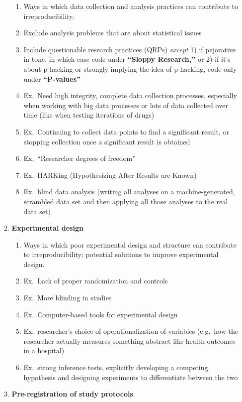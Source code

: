 \documentclass[
]{scrartcl}
\begin{document}
\begin{enumerate}
\begin{enumerate}
    \begin{enumerate}
    
    \item
      Ways in which data collection and analysis practices can
      contribute to irreproducibility.
    \item
      Exclude analysis problems that are about statistical issues
    \item
      Include questionable research practices (QRPs) \emph{except} 1) if
      pejorative in tone, in which case code under \textbf{``Sloppy
      Research,''} or 2) if it's about p-hacking or strongly implying
      the idea of p-hacking, code only under \textbf{``P-values''}
    \item
      Ex.~Need high integrity, complete data collection processes,
      especially when working with big data processes or lots of data
      collected over time (like when testing iterations of drugs)
    \item
      Ex.~Continuing to collect data points to find a significant
      result, or stopping collection once a significant result is
      obtained
    \item
      Ex.~``Researcher degrees of freedom''
    \item
      Ex.~HARKing (Hypothesizing After Results are Known)
    \item
      Ex.~blind data analysis (writing all analyses on a
      machine-generated, scrambled data set and then applying all those
      analyses to the real data set)
    \end{enumerate}
  \item
    \textbf{Experimental design}

    \begin{enumerate}
    
    \item
      Ways in which poor experimental design and structure can
      contribute to irreproducibility; potential solutions to improve
      experimental design.
    \item
      Ex.~Lack of proper randomization and controls
    \item
      Ex.~More blinding in studies
    \item
      Ex.~Computer-based tools for experimental design
    \item
      Ex.~researcher's choice of operationalization of variables
      (e.g.~how the researcher actually measures something abstract like
      health outcomes in a hospital)
    \item
      Ex.~strong inference tests, explicitly developing a competing
      hypothesis and designing experiments to differentiate between the
      two
    \end{enumerate}
  \item
    \textbf{Pre-registration of study protocols}


\end{enumerate}
\end{enumerate}
\end{document}
